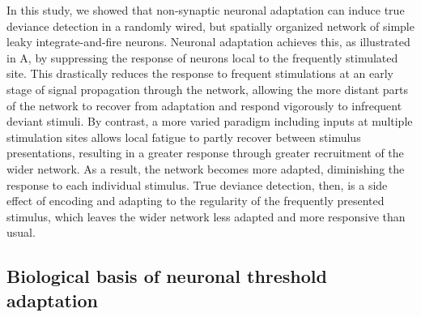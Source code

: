 \documentclass[9pt,lineno,onehalfspacing]{elife}
\begin{document}
In this study, we showed that non-synaptic neuronal adaptation can induce true deviance detection in a randomly wired, but spatially organized network of simple leaky integrate-and-fire neurons. Neuronal adaptation achieves this, as illustrated in A, by suppressing the response of neurons local to the frequently stimulated site. This drastically reduces the response to frequent stimulations at an early stage of signal propagation through the network, allowing the more distant parts of the network to recover from adaptation and respond vigorously to infrequent deviant stimuli. By contrast, a more varied paradigm including inputs at multiple stimulation sites allows local fatigue to partly recover between stimulus presentations, resulting in a greater response through greater recruitment of the wider network. As a result, the network becomes more adapted, diminishing the response to each individual stimulus. True deviance detection, then, is a side effect of encoding and adapting to the regularity of the frequently presented stimulus, which leaves the wider network less adapted and more responsive than usual.

\subsection{Biological basis of neuronal threshold adaptation}
\end{document}
